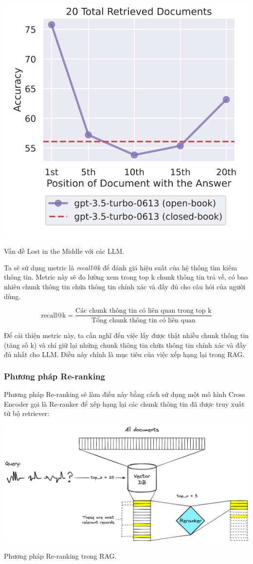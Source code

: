 \documentclass[a4paper, 12pt, openany]{book}
\begin{document}
\begin{minipage}{\linewidth}
    \centering
    \includegraphics[width=.7\linewidth]{./assets/images/lost-middle.png}
    \captionsetup{type=figure}
    \caption{Vấn đề Lost in the Middle với các LLM.}
\end{minipage}

Ta sẽ sử dụng metric là \textit{recall@k} để đánh giá hiệu suất của hệ thống tìm kiếm thông tin. Metric này sẽ đo lường xem trong top k chunk thông tin trả về, có bao nhiêu chunk thông tin chứa thông tin chính xác và đầy đủ cho câu hỏi của người dùng.

\begin{equation}
    \text{recall@k} = \frac{\text{Các chunk thông tin có liên quan trong top k}}{\text{Tổng chunk thông tin có liên quan}}
\end{equation}

Để cải thiện metric này, ta cần nghĩ đến việc lấy được thật nhiều chunk thông tin (tăng số k) và chỉ giữ lại
những chunk thông tin chứa thông tin chính xác và đầy đủ nhất cho LLM. Điều này chính là mục tiêu của việc xếp hạng lại trong RAG. 

\subsubsection{Phương pháp Re-ranking}
Phương pháp Re-ranking sẽ làm điều này bằng cách sử dụng một mô hình Cross Encoder gọi là Re-ranker để xếp hạng lại các chunk thông tin đã được truy xuất từ bộ retriever:

\begin{minipage}{\linewidth}
    \centering
    \includegraphics[width=.9\linewidth]{./assets/images/reranking.png}
    \captionsetup{type=figure}
    \caption{Phương pháp Re-ranking trong RAG.}
\end{minipage}
\vspace{0.5cm}
\end{document}
